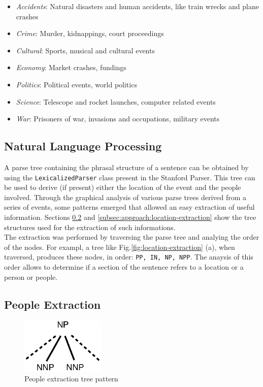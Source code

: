 \documentclass{llncs}
\begin{document}
\begin{itemize}
	\item \textit{Accidents}: Natural disasters and human accidents, like train wrecks and plane crashes
	\item \textit{Crime}: Murder, kidnappings, court proceedings
	\item \textit{Cultural}: Sports, musical and cultural events
	\item \textit{Economy}: Market crashes, fundings
	\item \textit{Politics}: Political events, world politics
	\item \textit{Science}: Telescope and rocket launches, computer related events
	\item \textit{War}: Prisoners of war, invasions and occupations, military events
\end{itemize}

\subsection{Natural Language Processing}
\label{subsec:approach:nlp}

A parse tree containing the phrasal structure of a sentence can be obtained by using the \verb!LexicalizedParser! class present in the Stanford Parser. This tree can be used to derive (if present) either the location of the event and the people involved. Through the graphical analysis of various parse trees derived from a series of events, some patterns emerged that allowed an easy extraction of useful information. Sections \ref{subsec:approach:people-extraction} and \ref{subsec:approach:location-extraction} show the tree structures used for the extraction of such informations.\cite{santorini}\cite{bies}\\

The extraction was performed by traversing the parse tree and analying the order of the nodes. For exampl, a tree like Fig.\ref{fig:location-extraction} (a), when traversed, produces these nodes, in order: \verb!PP, IN, NP, NPP!. The anaysis of this order allows to determine if a section of the sentence refers to a location or a person or people.

\subsection{People Extraction}
\label{subsec:approach:people-extraction}

\begin{figure}[h]
	\centering
	\includegraphics[width=40mm]{dia/people.eps}
	\caption{People extraction tree pattern}
	\label{fig:people-extraction}
\end{figure}
\end{document}
